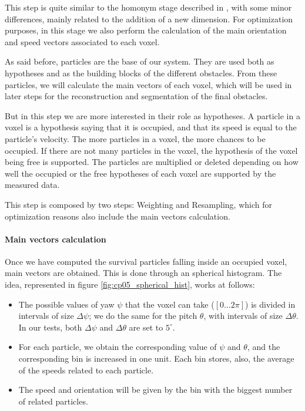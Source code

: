 This step is quite similar to the homonym stage described in \cite{danescu2012particle}, with some minor differences, mainly related to the addition of a new dimension. For optimization purposes, in this stage we also perform the calculation of the main orientation and speed vectors associated to each voxel.

As said before, particles are the base of our system. They are used both as hypotheses and as the building blocks of the different obstacles. From these particles, we will calculate the main vectors of each voxel, which will be used in later steps for the reconstruction and segmentation of the final obstacles.

But in this step we are more interested in their role as hypotheses. A particle in a voxel is a hypothesis saying that it is occupied, and that its speed is equal to the particle's velocity. The more particles in a voxel, the more chances to be occupied. If there are not many particles in the voxel, the hypothesis of the voxel being free is supported. The particles are multiplied or deleted depending on how well the occupied or the free hypotheses of each voxel are supported by the measured data.

This step is composed by two steps: Weighting and Resampling, which for optimization reasons also include the main vectors calculation.

\paragraph{Main vectors calculation}\label{ch:chapter05_01_04_02_01}

Once we have computed the survival particles falling inside an occupied voxel, main vectors are obtained. This is done through an spherical histogram. The idea, represented in figure \ref{fig:cp05_spherical_hist}, works at follows:
\begin{itemize}
 \item The possible values of yaw $\psi$ that the voxel can take ($[0\dots2\pi]$) is divided in intervals of size $\Delta\psi$; we do the same for the pitch $\theta$, with intervals of size $\Delta\theta$. In our tests, both $\Delta\psi$ and $\Delta\theta$ are set to $5^{\circ}$.
 \item For each particle, we obtain the corresponding value of $\psi$ and $\theta$, and the corresponding bin is increased in one unit. Each bin stores, also, the average of the speeds related to each particle.
 \item The speed and orientation will be given by the bin with the biggest number of related particles.
 \end{itemize}

